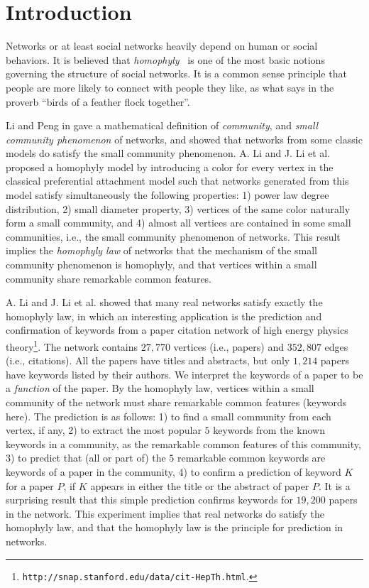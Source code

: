 \documentclass[11pt]{article}
\begin{document}
\section{Introduction}
\label{sec - introduction}
Networks or at least social networks heavily depend on human or
social behaviors. It is believed that {\em homophyly}~\cite[Chapter
4]{EK10} is one of the most basic notions governing the structure of
social networks. It is a common sense principle that people are more
likely to connect with people they like, as what says in the proverb
``birds of a feather flock together''.

Li and Peng in \cite{LP11,LP12} gave a mathematical definition of
{\it community}, and {\it small community phenomenon} of networks,
and showed that networks from some classic models do satisfy the
small community phenomenon. A. Li and J. Li et al. \cite{LLPP11} proposed
a homophyly model by introducing a color for every vertex in the classical
preferential attachment
model such that networks generated from this model satisfy
simultaneously the following properties: 1) power law degree
distribution, 2) small diameter property, 3) vertices of the same color
naturally form a small community, and 4) almost all vertices are
contained in some small communities, i.e., the small community
phenomenon of networks. This result implies the {\it homophyly law}
of networks that the mechanism of the small community phenomenon is
homophyly, and that vertices within a small community share
remarkable common features.

A. Li and J. Li et al. \cite{LLPP12} showed that many real networks
satisfy exactly the homophyly law, in which an interesting application is
the prediction and confirmation of keywords from a paper citation network
of high energy physics
theory\footnote{\texttt{http://snap.stanford.edu/data/cit-HepTh.html}.}.
The network contains $27,770$ vertices (i.e., papers) and $352,807$ edges
(i.e., citations). All the papers have titles and abstracts, but only $1,214$
papers have keywords listed by their authors.
We interpret the keywords of a paper to be a {\it function} of the paper.
By the homophyly law, vertices within a small community of the network must
share remarkable common features (keywords here).
The prediction is as follows: 1) to find a
small community from each vertex, if any, 2) to extract
the most popular $5$ keywords from the known keywords in a community,
as the remarkable common features of this community,
3) to predict that (all or part of) the $5$ remarkable common
keywords are keywords of a paper in the community, 4) to confirm a
prediction of keyword $K$ for a paper $P$, if $K$ appears in either
the title or the abstract of paper $P$. It is a surprising result
that this simple prediction confirms keywords for $19,200$ papers in
the network. This experiment implies that real networks do satisfy
the homophyly law, and that the homophyly law is the principle for
prediction in networks.
\end{document}
